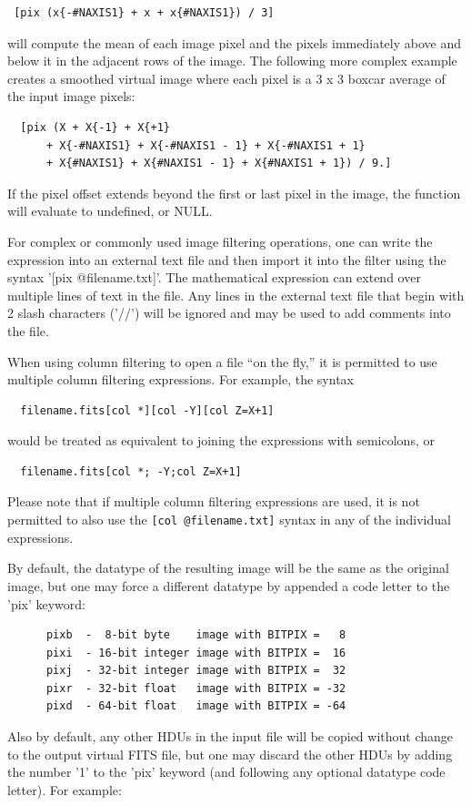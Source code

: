 \documentclass[11pt]{book}
\begin{document}
\begin{verbatim}
 [pix (x{-#NAXIS1} + x + x{#NAXIS1}) / 3]
\end{verbatim}
will compute the mean of each image pixel and the pixels immediately
above and below it in the adjacent rows of the image.
The following more complex example
creates a smoothed virtual image where each pixel
is a 3 x 3 boxcar average of the input image pixels:

\begin{verbatim}
  [pix (X + X{-1} + X{+1}
      + X{-#NAXIS1} + X{-#NAXIS1 - 1} + X{-#NAXIS1 + 1}
      + X{#NAXIS1} + X{#NAXIS1 - 1} + X{#NAXIS1 + 1}) / 9.]
\end{verbatim}
If the pixel offset
extends beyond the first or last pixel in the image, the function will
evaluate to undefined, or NULL.

For  complex  or commonly used image filtering operations,
one  can  write the expression into an external text  file and
then import it  into the
filter using  the syntax '[pix @filename.txt]'.   The mathematical
expression can
extend over multiple lines of text in the  file.
Any lines in the external text file
that begin with 2 slash characters ('//') will be ignored and may be
used to add comments into the file.

When using column filtering to open a file ``on the fly,'' it is permitted
to use multiple column filtering expressions.  For example, the
syntax
\begin{verbatim}
  filename.fits[col *][col -Y][col Z=X+1]
\end{verbatim}
would be treated as equivalent to joining the expressions with semicolons,
or
\begin{verbatim}
  filename.fits[col *; -Y;col Z=X+1]
\end{verbatim}
Please note that if multiple column filtering expressions are used, it is
not permitted to also use the \verb+[col @filename.txt]+ syntax in any
of the individual expressions.

By default, the datatype of the resulting image will be the same as
the original image, but one may force a different datatype by appended
a code letter to the 'pix' keyword:

\begin{verbatim}
      pixb  -  8-bit byte    image with BITPIX =   8
      pixi  - 16-bit integer image with BITPIX =  16
      pixj  - 32-bit integer image with BITPIX =  32
      pixr  - 32-bit float   image with BITPIX = -32
      pixd  - 64-bit float   image with BITPIX = -64
\end{verbatim}
Also by default, any other HDUs in the input file will be copied without
change to the
output virtual FITS file, but one may discard the other HDUs by adding
the number '1' to the 'pix' keyword (and following any optional datatype code
letter).  For example:
\end{document}
